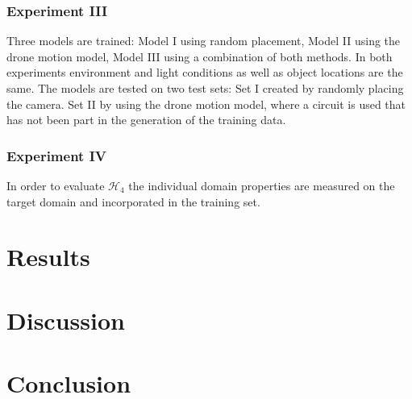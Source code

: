 \subsubsection{Experiment III}

Three models are trained: Model I using random placement, Model II using the drone motion model, Model III using a combination of both methods. In both experiments environment and light conditions as well as object locations are the same. The models are tested on two test sets: Set I created by randomly placing the camera. Set II by using the drone motion model, where a circuit is used that has not been part in the generation of the training data.


\subsubsection{Experiment IV}

In order to evaluate $\mathcal{H}_4$ the individual domain properties are measured on the target domain and incorporated in the training set.


\section{Results}
\label{sec:training:results}

\section{Discussion}
\label{sec:training:discussion}

\section{Conclusion}
\label{sec:training:conclusion}
